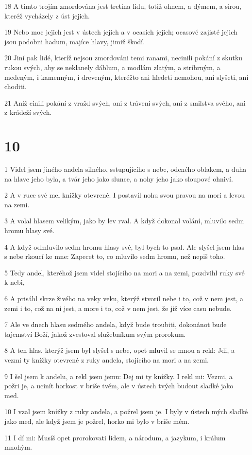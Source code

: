 \par 18 A tímto trojím zmordována jest tretina lidu, totiž ohnem, a dýmem, a sirou, kteréž vycházely z úst jejich.
\par 19 Nebo moc jejich jest v ústech jejich a v ocasích jejich; ocasové zajisté jejich jsou podobni hadum, majíce hlavy, jimiž škodí.
\par 20 Jiní pak lidé, kteríž nejsou zmordováni temi ranami, necinili pokání z skutku rukou svých, aby se neklanely dáblum, a modlám zlatým, a stríbrným, a medeným, i kamenným, i dreveným, kteréžto ani hledeti nemohou, ani slyšeti, ani choditi.
\par 21 Aniž cinili pokání z vražd svých, ani z trávení svých, ani z smilstva svého, ani z krádeží svých.

\chapter{10}

\par 1 Videl jsem jiného andela silného, sstupujícího s nebe, odeného oblakem, a duha na hlave jeho byla, a tvár jeho jako slunce, a nohy jeho jako sloupové ohniví.
\par 2 A v ruce své mel knížky otevrené. I postavil nohu svou pravou na mori a levou na zemi.
\par 3 A volal hlasem velikým, jako by lev rval. A když dokonal volání, mluvilo sedm hromu hlasy své.
\par 4 A když odmluvilo sedm hromu hlasy své, byl bych to psal. Ale slyšel jsem hlas s nebe rkoucí ke mne: Zapecet to, co mluvilo sedm hromu, než nepiš toho.
\par 5 Tedy andel, kteréhož jsem videl stojícího na mori a na zemi, pozdvihl ruky své k nebi,
\par 6 A prisáhl skrze živého na veky veku, kterýž stvoril nebe i to, což v nem jest, a zemi i to, což na ní jest, a more i to, což v nem jest, že již více casu nebude.
\par 7 Ale ve dnech hlasu sedmého andela, když bude troubiti, dokonánot bude tajemství Boží, jakož zvestoval služebníkum svým prorokum.
\par 8 A ten hlas, kterýž jsem byl slyšel s nebe, opet mluvil se mnou a rekl: Jdi, a vezmi ty knížky otevrené z ruky andela, stojícího na mori a na zemi.
\par 9 I šel jsem k andelu, a rekl jsem jemu: Dej mi ty knížky. I rekl mi: Vezmi, a požri je, a ucinít horkost v briše tvém, ale v ústech tvých budout sladké jako med.
\par 10 I vzal jsem knížky z ruky andela, a požrel jsem je. I byly v ústech mých sladké jako med, ale když jsem je požrel, horko mi bylo v briše mém.
\par 11 I dí mi: Musíš opet prorokovati lidem, a národum, a jazykum, i králum mnohým.

